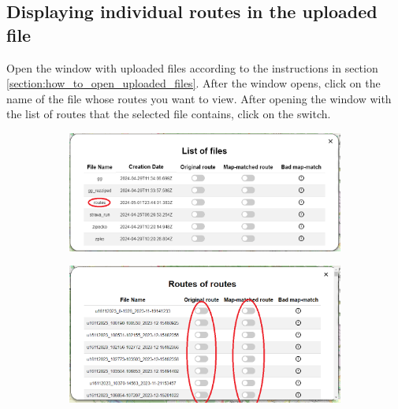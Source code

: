 \subsection{Displaying individual routes in the uploaded file}
Open the window with uploaded files according to the instructions in section \ref{section:how_to_open_uploaded_files}. After the window opens, click on the name of the file whose routes you want to view. After opening the window with the list of routes that the selected file contains, click on the switch.
\begin{figure}[H]
     \centering
     \begin{subfigure}{1\textwidth}
         \centering
         \includegraphics[width=1\textwidth]{guide_includes/img/open_file.png}
     \end{subfigure}
     \begin{subfigure}{1\textwidth}
         \centering
         \includegraphics[width=1\textwidth]{guide_includes/img/toggle_route.png}
     \end{subfigure}
\end{figure}

